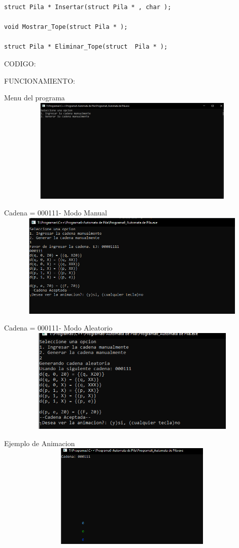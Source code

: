 \documentclass[a4paper]{report}
\begin{document}
\begin{flushleft}
\begin{lstlisting}
struct Pila * Insertar(struct Pila * , char );

void Mostrar_Tope(struct Pila * );

struct Pila * Eliminar_Tope(struct  Pila * );

\end{lstlisting}
\newpage

CODIGO:


\newpage

FUNCIONAMIENTO:

Menu del programa
\includegraphics[width= 15cm, height= 5cm]{p6-1.png}

Cadena  = 000111- Modo Manual
\includegraphics[width= 15cm, height= 5cm]{p6-2.png}

Cadena  = 000111- Modo Aleatorio
\includegraphics[width= 15cm, height= 5cm]{p6-5.png}
\newpage

Ejemplo de Animacion
\includegraphics[width= 15cm, height= 5cm]{p6-3.png}


\end{flushleft}
\end{document}
